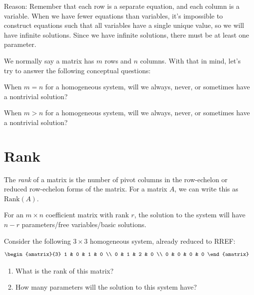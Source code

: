 \documentclass[11pt]{exam}
\begin{document}
        Reason: Remember that each row is a separate equation, and each column is a variable. When we have fewer equations than variables,
        it's impossible to construct equations such that all variables have a single unique value, so we will have infinite solutions. Since
        we have infinite solutions, there must be at least one parameter.

        We normally say a matrix has $m$ rows and $n$ columns. With that in mind, let's try to answer the following conceptual questions:

        \begin{questions}
            \item When $m = n$ for a homogeneous system, will we always, never, or sometimes have a nontrivial solution?
            \item When $m > n$ for a homogeneous system, will we always, never, or sometimes have a nontrivial solution?
        \end{questions}


\pagebreak
\section{Rank}
    The \textit{rank} of a matrix is the number of pivot columns in the row-echelon or reduced row-echelon forms of the matrix.
    For a matrix $A$, we can write this as $\text{Rank}(A)$.

    For an $m \times n$ coefficient matrix with rank $r$, the solution to the system will have $n - r$ parameters/free variables/basic solutions.

    \begin{questions}
        \item Consider the following $3 \times 3$ homogeneous system, already reduced to RREF:
        $$\begin{amatrix}{3}
            1 & 0 & 1 & 0 \\
            0 & 1 & 2 & 0 \\
            0 & 0 & 0 & 0
        \end{amatrix}$$
        \begin{enumerate}
            \item What is the rank of this matrix?
            \item How many parameters will the solution to this system have?
        \end{enumerate}
    \end{questions}
\end{document}
